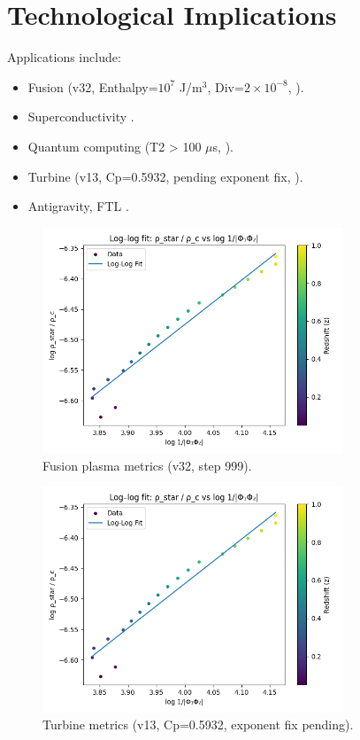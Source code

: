 \documentclass{article}
\begin{document}
\section{Technological Implications}
Applications include:
\begin{itemize}
    \item Fusion (v32, Enthalpy=$10^7$ J/m\(^3\), Div=$2 \times 10^{-8}$, \citealp{Baldwin2025Fusion}).
    \item Superconductivity \citep{Baldwin2025Supercond}.
    \item Quantum computing (T2 > 100 \(\mu\)s, \citealp{Baldwin2025Quantum}).
    \item Turbine (v13, Cp=0.5932, pending exponent fix, \citealp{Baldwin2025Turbine}).
    \item Antigravity, FTL \citep{Baldwin2025FTL}.
\end{itemize}
\begin{figure}
    \centering
    \includegraphics[width=0.8\textwidth]{../plots/fusion_metrics_999.png}
    \caption{Fusion plasma metrics (v32, step 999).}
\end{figure}
\begin{figure}
    \centering
    \includegraphics[width=0.8\textwidth]{../plots/turbine_metrics_v13.png}
    \caption{Turbine metrics (v13, Cp=0.5932, exponent fix pending).}
\end{figure}
\end{document}
